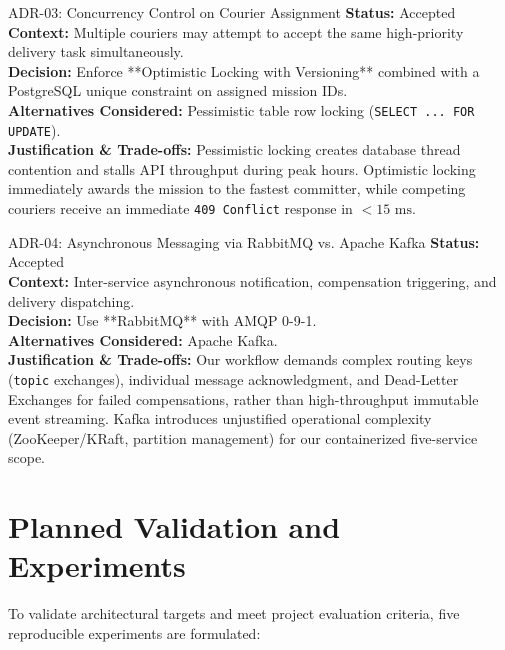 \documentclass[11pt,a4paper]{article}
\begin{document}
\begin{adrbox}{ADR-03: Concurrency Control on Courier Assignment}
\textbf{Status:} Accepted\\
\textbf{Context:} Multiple couriers may attempt to accept the same high-priority delivery task simultaneously.\\
\textbf{Decision:} Enforce **Optimistic Locking with Versioning** combined with a PostgreSQL unique constraint on assigned mission IDs.\\
\textbf{Alternatives Considered:} Pessimistic table row locking (\texttt{SELECT ... FOR UPDATE}).\\
\textbf{Justification \& Trade-offs:} Pessimistic locking creates database thread contention and stalls API throughput during peak hours. Optimistic locking immediately awards the mission to the fastest committer, while competing couriers receive an immediate \texttt{409 Conflict} response in $< 15\text{ ms}$.
\end{adrbox}

\vspace{0.3cm}

\begin{adrbox}{ADR-04: Asynchronous Messaging via RabbitMQ vs. Apache Kafka}
\textbf{Status:} Accepted\\
\textbf{Context:} Inter-service asynchronous notification, compensation triggering, and delivery dispatching.\\
\textbf{Decision:} Use **RabbitMQ** with AMQP 0-9-1.\\
\textbf{Alternatives Considered:} Apache Kafka.\\
\textbf{Justification \& Trade-offs:} Our workflow demands complex routing keys (\texttt{topic} exchanges), individual message acknowledgment, and Dead-Letter Exchanges for failed compensations, rather than high-throughput immutable event streaming. Kafka introduces unjustified operational complexity (ZooKeeper/KRaft, partition management) for our containerized five-service scope.
\end{adrbox}

\newpage
\section{Planned Validation and Experiments}

To validate architectural targets and meet project evaluation criteria, five reproducible experiments are formulated:
\end{document}
